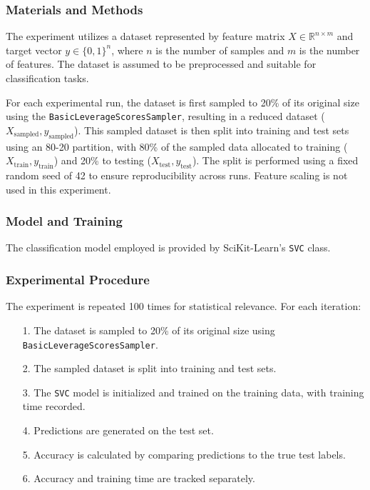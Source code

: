 \documentclass{article}
\theoremstyle{plain}
\theoremstyle{definition}
\theoremstyle{remark}
\begin{document}
\subsubsection{Materials and Methods}

The experiment utilizes a dataset represented by feature matrix $ X \in \mathbb{R}^{n \times m} $ and target vector $ y \in \{0, 1\}^n $, where $ n $ is the number of samples and $ m $ is the number of features. The dataset is assumed to be preprocessed and suitable for classification tasks.

For each experimental run, the dataset is first sampled to 20\% of its original size using the \texttt{BasicLeverageScoresSampler}, resulting in a reduced dataset ($ X_{\text{sampled}}, y_{\text{sampled}} $). This sampled dataset is then split into training and test sets using an 80-20 partition, with 80\% of the sampled data allocated to training ($ X_{\text{train}}, y_{\text{train}} $) and 20\% to testing ($ X_{\text{test}}, y_{\text{test}} $). The split is performed using a fixed random seed of 42 to ensure reproducibility across runs. Feature scaling is not used in this experiment.

\subsubsection{Model and Training}

The classification model employed is provided by SciKit-Learn's \texttt{SVC} class.

\subsubsection{Experimental Procedure}

The experiment is repeated 100 times for statistical relevance. For each iteration:

\begin{itemize}
	\item [1.] The dataset is sampled to 20\% of its original size using \texttt{BasicLeverageScoresSampler}.
	\item [2.] The sampled dataset is split into training and test sets.
	\item [3.] The \texttt{SVC} model is initialized and trained on the training data, with training time recorded.
	\item [4.] Predictions are generated on the test set.
	\item [5.] Accuracy is calculated by comparing predictions to the true test labels.
	\item [6.] Accuracy and training time are tracked separately.
\end{itemize}
\end{document}
